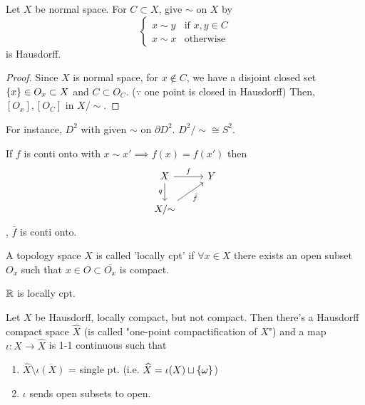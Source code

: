 \documentclass{article}
\begin{document}
\begin{proposition}
    Let $X$ be normal space. For $C \subset X$, give $\sim$ on $X$ by
    \[
        \begin{cases}
            x \sim y & \text{if } x, y \in C \\
            x \sim x & \text{otherwise}   
        \end{cases}
    \]
    is Hausdorff.
\end{proposition}

\begin{proof}
    Since $X$ is normal space, for $x \not\in C$, we have a disjoint closed set $\left\{ x \right\} \in O_x \subset X$ and $C \subset O_C$. ($\because$ one point is closed in Hausdorff) Then, $[O_x], [O_C]$ in $X/{\sim}$.
\end{proof}

For instance, $D^2$ with given $\sim$ on $\partial{D^2}$. $D^2/{\sim}\cong S^2$.

\begin{proposition}
If $f$ is conti onto with $x\sim x' \implies f(x)=f(x')$ then
\[
\begin{tikzcd}
    X \arrow[r, "f"] \arrow[d, "q"'] & Y \\
    X/{\sim} \arrow[ur, "\bar f"']
\end{tikzcd}
\], $\bar f$ is conti onto.
\end{proposition}

\begin{definition}
    A topology space $X$ is called 'locally cpt' if $\forall x \in X$ there exists an open subset $O_x$ such that $x \in O \subset \overline{O_x}$ is compact.
\end{definition}

$\mathbb{R}$ is locally cpt.

\begin{theorem}
    Let $X$ be Hausdorff, locally compact, but not compact. Then there's a Hausdorff compact space $\widehat{X}$ (is called "one-point compactification of $X$") and a map $\iota: X\to \widehat{X}$ is 1-1 continuous such that
    \begin{enumerate}[label=\roman*)]
        \item $\widehat{X}\setminus \overline{\iota(X)}$ = single pt. (i.e. $\widehat{X}=\iota(X) \sqcup \left\{ \omega \right\}$)
        \item $\iota$ sends open subsets to open.
    \end{enumerate}
\end{theorem}
\end{document}
